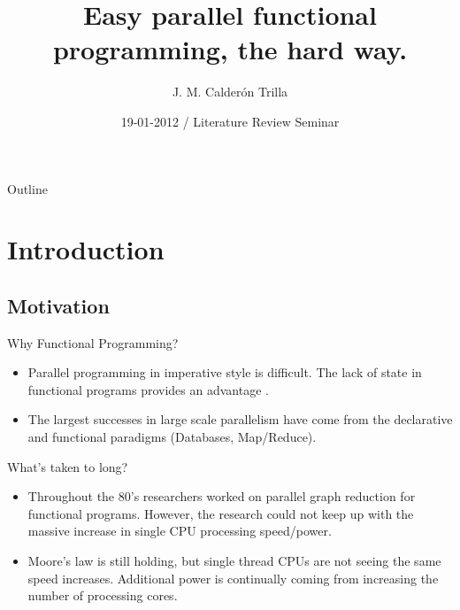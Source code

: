 \documentclass{beamer}
\title[Parallel Graph Reduction] %
{Easy parallel functional programming, the hard way.}
\subtitle
{} %
\author[] %
{J. M. Calder\'{o}n Trilla}
\institute[University of York] %
{%
  Department of Computer Science\\
  PLASMA Research Group \\
  University of York
 }
\date[] %
{19-01-2012 / Literature Review Seminar}
\begin{document}
\begin{frame}
  \titlepage
\end{frame}

\begin{frame}{Outline}
  \tableofcontents
\end{frame}




\section{Introduction}

\subsection[Motivation]{Motivation}

\begin{frame}{Why Functional Programming?}
    \begin{itemize}
        \item
            Parallel programming in imperative style is difficult. The lack of state in
            functional programs provides an advantage \citep{PFPAnIntro}.
        \item
            The largest successes in large scale parallelism have come from the declarative
            and functional paradigms (Databases, Map/Reduce).
    \end{itemize}
\end{frame}

\begin{frame}{What's taken to long?}
    \begin{itemize}
        \item
            Throughout the 80's researchers worked on parallel graph reduction for functional
            programs. However, the research could not keep up with the massive increase
            in single CPU processing speed/power. 
        \item
            Moore's law is still holding, but single thread CPUs are not seeing the same speed
            increases. Additional power is continually coming from increasing the number of 
            processing cores.
             
    \end{itemize}
\end{frame}
\end{document}
